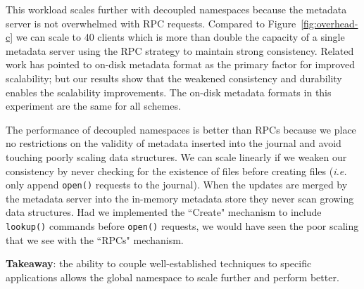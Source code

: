 This workload scales further with decoupled namespaces because the metadata
server is not overwhelmed with RPC requests. Compared to
Figure~\ref{fig:overhead-c} we can scale to 40 clients which is more than
double the capacity of a single metadata server using the RPC strategy to
maintain strong consistency. Related work has pointed to on-disk metadata
format as the primary factor for improved scalability; but our results show
that the weakened consistency and durability enables the scalability
improvements. The on-disk metadata formats in this experiment are the same for
all schemes.

The performance of decoupled namespaces is better than RPCs because we place no
restrictions on the validity of metadata inserted into the journal and avoid
touching poorly scaling data structures. We can scale linearly if we weaken our
consistency by never checking for the existence of files before creating files
({\it i.e.} only append \texttt{open()} requests to the journal).  When the
updates are merged by the metadata server into the in-memory metadata store
they never scan growing data structures.  Had we implemented the ``Create"
mechanism to include \texttt{lookup()} commands before \texttt{open()}
requests, we would have seen the poor scaling that we see with the ``RPCs"
mechanism. 


%

\textbf{Takeaway}: the ability to couple well-established techniques to
specific applications allows the global namespace to scale further and perform
better.

